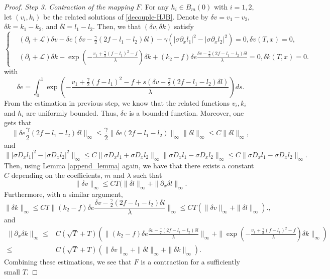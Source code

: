 \documentclass[11pt]{article}
\begin{document}
\begin{proof}
{\it Step 3. Contraction of the mapping $F$.}
For any $h_i \in B_m(0)$ with $i=1,2$, let $(v_i,k_i)$ be the related solutions of \eqref{decouple-HJB}.  Denote by $\delta v=v_1-v_2$, $\delta k=k_1-k_2$, and $\delta l=l_1-l_2$. Then, we that $(\delta v,\delta k)$ satisfy 
\begin{equation}\label{delta-HJB}
\left\{
\begin{split}
&(\partial_t+\mathcal L)\delta v- \delta e(\delta v-\frac\gamma 2(2f-l_1-l_2)\delta l)-\gamma(|\sigma \partial_x l_1|^2-|\sigma \partial_x l_2|^2)=0, \delta v(T,x)=0,\\
& (\partial_t+\mathcal L) \delta k-\exp(-\frac{v_1+\frac{\gamma}{2}(f-l_1)^2-f}{\lambda})\delta k+(k_2-f)\delta e\frac{\delta v-\frac\gamma 2(2f-l_1-l_2)\delta l}{\lambda} =0,\delta k(T,x)=0.
\end{split}
\right.
\end{equation}
with 
$$
\delta e=\int_0^1 \exp(-\frac{v_1+\frac{\gamma}{2}(f-l_1)^2-f+s(\delta v-\frac\gamma 2(2f-l_1-l_2)\delta l)}{\lambda})ds.
$$
From the estimation in previous step, we know that  the related functions $v_i,k_i$ and $h_i$ are uniformly bounded. Thus, $\delta e$ is a bounded function. Moreover, one gets that 
$$
\|\delta e \frac \gamma2(2f-l_1-l_2)\delta l\|_\infty \le \frac\gamma 2\| \delta e(2f-l_1-l_2)\|_{\infty}\|\delta l\|_\infty \le C\|\delta l\|_\infty,
$$
and 
$$
\||\sigma D_x l_1|^2-|\sigma D_x l_2|^2 \|_\infty \le C\| \sigma D_x l_1+\sigma D_x l_2\|_\infty\| \sigma D_x l_1-\sigma D_x l_2\|_\infty \le C\| \sigma D_x l_1-\sigma D_x l_2\|_\infty.
$$
Then, using Lemma \ref{append_lemma} again, we have that there exists a constant $C$ depending on the coefficients, $m$ and $\lambda$ such that 
$$
\|\delta v\|_{\infty} \le CT(\|\delta l\|_{\infty}+\|\partial_x \delta l\|_{\infty}. 
$$
Furthermore, with a similar argument, 
$$
\|\delta k\|_\infty \le CT\|(k_2-f)\delta e\frac{\delta v-\frac\gamma 2(2f-l_1-l_2)\delta l}{\lambda}\|_\infty\le CT(\|\delta v\|_\infty+\|\delta l\|_\infty).,
$$
and
\begin{equation*}
\begin{split}
\|\partial_x \delta k\|_{\infty} \le& C(\sqrt{T}+T)(\|(k_2-f)\delta e\frac{\delta v-\frac\gamma 2(2f-l_1-l_2)\delta l}{\lambda}\|_\infty+\|\exp(-\frac{v_1+\frac{\gamma}{2}(f-l_1)^2-f}{\lambda})\delta k\|_\infty)\\
\le&C(\sqrt{T}+T)(\|\delta v\|_\infty+\|\delta l\|_\infty+\|\delta k\|_\infty).
\end{split}
\end{equation*}
Combining these estimations, we  see that $F$ is a contraction for a sufficiently small $T$.
\end{proof}
\end{document}
